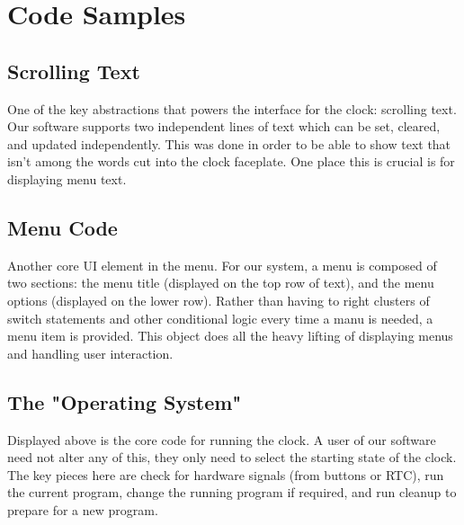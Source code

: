 \documentclass[onecolumn, draftclsnofoot,10pt, compsoc]{IEEEtran}
\begin{document}
\section{Code Samples}
\subsection{Scrolling Text}

One of the key abstractions that powers the interface for the clock: scrolling text.
Our software supports two independent lines of text which can be set, cleared, and updated independently.
This was done in order to be able to show text that isn’t among the words cut into the clock faceplate.
One place this is crucial is for displaying menu text.
\vspace{5mm}
\subsection{Menu Code}

Another core UI element in the menu.
For our system, a menu is composed of two sections: the menu title (displayed on the top row of text), and the menu options (displayed on the lower row).
Rather than having to right clusters of switch statements and other conditional logic every time a manu is needed, a menu item is provided.
This object does all the heavy lifting of displaying menus and handling user interaction.
\vspace{5mm}
\subsection{The "Operating System"}

Displayed above is the core code for running the clock.
A user of our software need not alter any of this, they only need to select the starting state of the clock.
The key pieces here are check for hardware signals (from buttons or RTC), run the current program, change the running program if required, and run cleanup to prepare for a new program.
\end{document}
